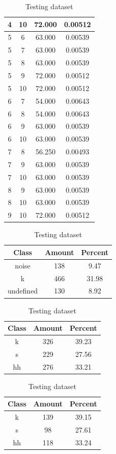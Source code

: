 \begin{table}
\begin{subtable}[h]{0.45\textwidth}
{\begin{tabular}{|c|c|c|c|}
 4 & 10 & 72.000 & 0.00512\\ \hline 
 5 & 6 & 63.000 & 0.00539\\ \hline 
 5 & 7 & 63.000 & 0.00539\\ \hline 
 5 & 8 & 63.000 & 0.00539\\ \hline 
 5 & 9 & 72.000 & 0.00512\\ \hline 
 5 & 10 & 72.000 & 0.00512\\ \hline 
 6 & 7 & 54.000 & 0.00643\\ \hline 
 6 & 8 & 54.000 & 0.00643\\ \hline 
 6 & 9 & 63.000 & 0.00539\\ \hline 
 6 & 10 & 63.000 & 0.00539\\ \hline 
 7 & 8 & 56.250 & 0.00493\\ \hline 
 7 & 9 & 63.000 & 0.00539\\ \hline 
 7 & 10 & 63.000 & 0.00539\\ \hline 
 8 & 9 & 63.000 & 0.00539\\ \hline 
 8 & 10 & 63.000 & 0.00539\\ \hline 
 9 & 10 & 72.000 & 0.00512\\ \hline 

\end{tabular}
}\label{xlsflux105}
\caption{xcsflux105}
\end{subtable}

\begin{subtable}[h]{0.45\textwidth}
\centering
\begin{tabular}{|c|c|c|}
\hline
Class & Amount & Percent\\ \hline
noise & 138 & 9.47\\ \hline
k & 466 & 31.98\\ \hline
undefined & 130 & 8.92\\ \hline
\end{tabular}
\caption{Entire dataset after stripping short sounds}
\end{subtable}
\hfill
\begin{subtable}[h]{0.45\textwidth}
\centering
\begin{tabular}{|c|c|c|}
\hline
Class & Amount & Percent\\ \hline
k & 326 & 39.23\\ \hline
s & 229 & 27.56\\ \hline
hh & 276 & 33.21\\ \hline
\end{tabular}
\caption{Training dataset}
\end{subtable}
\hfill
\begin{subtable}[h]{0.45\textwidth}
\centering
\begin{tabular}{|c|c|c|}
\hline
Class & Amount & Percent\\ \hline
k & 139 & 39.15\\ \hline
s & 98 & 27.61\\ \hline
hh & 118 & 33.24\\ \hline
\end{tabular}
\caption{Testing dataset}
\end{subtable}
\hfill


\end{table}
